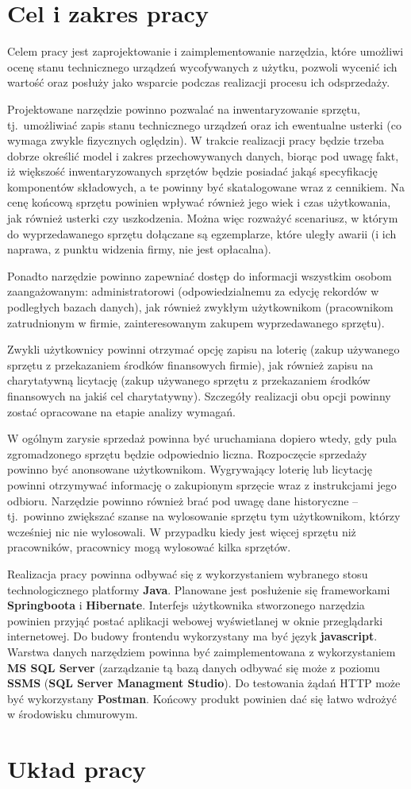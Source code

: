\section{Cel i zakres pracy}
Celem pracy jest zaprojektowanie i zaimplementowanie narzędzia, które umożliwi ocenę stanu technicznego urządzeń wycofywanych z użytku, pozwoli wycenić ich wartość oraz posłuży jako wsparcie podczas realizacji procesu ich odsprzedaży. 

Projektowane narzędzie powinno pozwalać na inwentaryzowanie sprzętu, tj.\ umożliwiać zapis stanu technicznego urządzeń oraz ich ewentualne usterki (co wymaga zwykle fizycznych oględzin). W trakcie realizacji pracy będzie trzeba dobrze określić model i zakres przechowywanych danych, biorąc pod uwagę fakt, iż większość inwentaryzowanych sprzętów będzie posiadać jakąś specyfikację komponentów składowych, a te powinny być skatalogowane wraz z cennikiem. Na cenę końcową sprzętu powinien wpływać również jego 
wiek i czas użytkowania, jak również usterki czy uszkodzenia. Można więc rozważyć scenariusz, w którym do wyprzedawanego sprzętu dołączane są egzemplarze, które uległy awarii (i ich naprawa, z punktu widzenia firmy, nie jest opłacalna).


Ponadto narzędzie powinno zapewniać dostęp do informacji wszystkim osobom zaangażowanym: administratorowi (odpowiedzialnemu za edycję rekordów w podległych bazach danych),
jak również zwykłym użytkownikom (pracownikom zatrudnionym w firmie, zainteresowanym zakupem wyprzedawanego sprzętu). 

Zwykli użytkownicy powinni otrzymać opcję zapisu na loterię (zakup używanego sprzętu z przekazaniem środków finansowych firmie), jak również zapisu na charytatywną licytację (zakup używanego sprzętu z przekazaniem środków finansowych na jakiś cel charytatywny). Szczegóły realizacji obu opcji powinny zostać opracowane na etapie analizy wymagań. 

W ogólnym zarysie sprzedaż powinna być uruchamiana dopiero wtedy, gdy pula zgromadzonego sprzętu będzie odpowiednio liczna. Rozpoczęcie sprzedaży powinno być anonsowane użytkownikom. Wygrywający loterię lub licytację powinni otrzymywać informację o zakupionym sprzęcie wraz z instrukcjami jego odbioru. Narzędzie powinno również brać pod uwagę dane historyczne -- tj.\ powinno zwiększać szanse na wylosowanie sprzętu tym użytkownikom, którzy wcześniej nic nie wylosowali. W przypadku kiedy jest więcej sprzętu niż pracowników, pracownicy mogą wylosować kilka sprzętów.

Realizacja pracy powinna odbywać się z wykorzystaniem wybranego stosu technologicznego platformy \textbf{Java}. Planowane jest posłużenie się frameworkami \textbf{Springboota} i \textbf{Hibernate}. Interfejs użytkownika stworzonego narzędzia powinien przyjąć postać aplikacji webowej wyświetlanej w oknie przeglądarki internetowej. Do budowy frontendu wykorzystany ma być język \textbf{javascript}. Warstwa danych narzędziem powinna być zaimplementowana z wykorzystaniem \textbf{MS SQL Server} (zarządzanie tą bazą danych odbywać się może z poziomu  \textbf{SSMS} (\textbf{SQL Server Managment Studio}). Do testowania żądań HTTP może być wykorzystany \textbf{Postman}. Końcowy produkt powinien dać się łatwo wdrożyć w środowisku chmurowym.

\section{Układ pracy}


